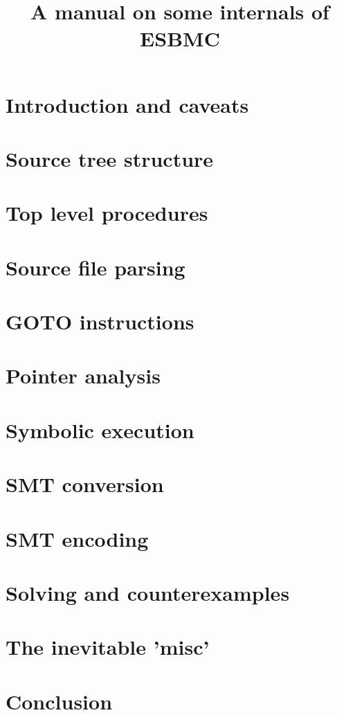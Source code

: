 \documentclass{article}
\begin{document}
\title{A manual on some internals of ESBMC}
\section{Introduction and caveats}
\section{Source tree structure}
\section{Top level procedures}
\section{Source file parsing}
\section{GOTO instructions}
\section{Pointer analysis}
\section{Symbolic execution}
\section{SMT conversion}
\section{SMT encoding}
\section{Solving and counterexamples}
\section{The inevitable 'misc'}
\section{Conclusion}
\end{document}
